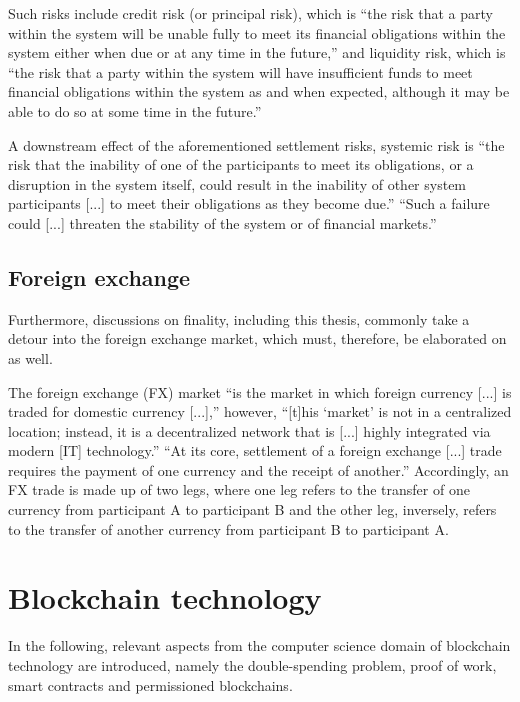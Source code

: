Such risks include credit risk (or principal risk), which is ``the risk that a party within the system will be unable fully to meet its financial obligations within the system either when due or at any time in the future,'' and liquidity risk, which is ``the risk that a party within the system will have insufficient funds to meet financial obligations within the system as and when expected, although it may be able to do so at some time in the future.'' \autocite[5]{cpmi2001}

A downstream effect of the aforementioned settlement risks, systemic risk is ``the risk that the inability of one of the participants to meet its obligations, or a disruption in the system itself, could result in the inability of other system participants [...] to meet their obligations as they become due.'' \autocite[5]{cpmi2001}
``Such a failure could [...] threaten the stability of the system or of financial markets.'' \autocite[5]{cpmi2001}

\subsection{Foreign exchange}

Furthermore, discussions on finality, including this thesis, commonly take a detour into the foreign exchange market, which must, therefore, be elaborated on as well.

The foreign exchange (FX) market ``is the market in which foreign currency [...] is traded for domestic currency [...],'' however, ``[t]his `market' is not in a centralized location; instead, it is a decentralized network that is [...] highly integrated via modern [IT] technology.'' \autocite{econlib2020fx}
``At its core, settlement of a foreign exchange [...] trade requires the payment of one currency and the receipt of another.'' \autocite[4]{cpmi1996}
Accordingly, an FX trade is made up of two legs, where one leg refers to the transfer of one currency from participant A to participant B and the other leg, inversely, refers to the transfer of another currency from participant B to participant A.

\section{Blockchain technology}

In the following, relevant aspects from the computer science domain of blockchain technology are introduced, namely the double-spending problem, proof of work, smart contracts and permissioned blockchains.

